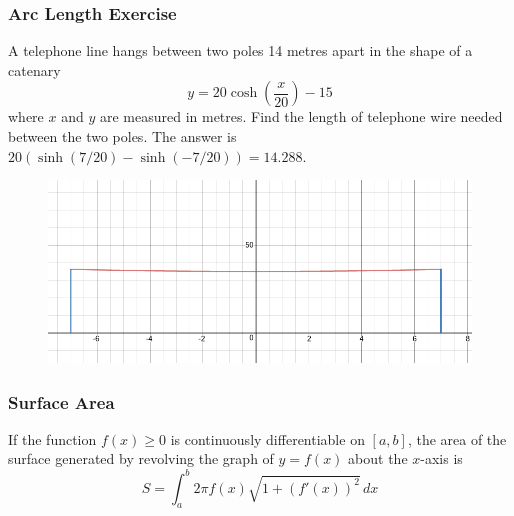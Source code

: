 \documentclass[xcolor=dvipsnames]{beamer}
\begin{document}
\addtocounter{equation}{-1}
\addtocounter{exercise}{-1}

\begin{frame}
  \frametitle{Arc Length Exercise}
{\ubung} A telephone line hangs between two poles 14 metres apart in
the shape of a catenary
\begin{equation}
  \label{eq:aeweerae}
  y=20\cosh\left(\frac{x}{20}\right)-15
\end{equation}
where $x$ and $y$ are measured in metres. Find the length of telephone
wire needed between the two poles. The answer is $20(\sinh(7/20)-\sinh(-7/20))=14.288$.
\begin{figure}[h]
  \includegraphics[scale=0.22]{./diagrams/telwire.png}
\end{figure}
\end{frame}

\begin{frame}
  \frametitle{Surface Area}
  If the function $f(x)\geq{}0$ is continuously differentiable on
  $[a,b]$, the \alert{area of the surface} generated by revolving the
  graph of $y=f(x)$ about the $x$-axis is
  \begin{equation}
    \label{eq:xaimosah}
    S=\int_{a}^{b}2\pi{}f(x)\sqrt{1+\left(f'(x)\right)^{2}}\,dx
  \end{equation}
\end{frame}
\end{document}

